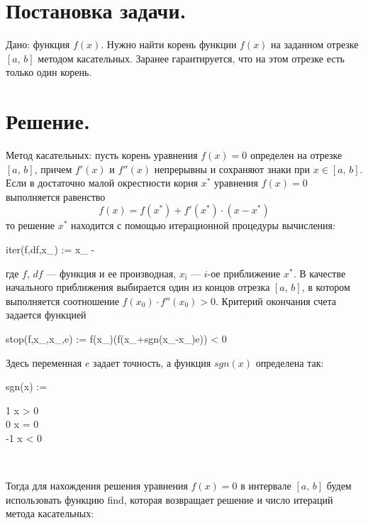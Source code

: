 \documentclass[a4paper, 14pt]{extarticle}
\begin{document}
\section*{Постановка задачи.}

Дано: функция $f(x)$. Нужно найти корень функции $f(x)$ на заданном отрезке $[a,\,b]$ методом касательных. Заранее гарантируется, что на этом отрезке есть только один корень.

\section*{Решение.}

Метод касательных: пусть корень уравнения $f(x)=0$ определен на отрезке $[a,\,b]$, причем $f'(x)$ и $f''(x)$ непрерывны и сохраняют знаки при $x\in[a,\,b]$. Если в достаточно малой окрестности корня $x^*$ уравнения $f(x)=0$ выполняется равенство
$$f(x)=f(x^*)+f'(x^*)\cdot(x-x^*)$$ то решение $x^*$ находится с помощью итерационной процедуры вычисления:
\begin{preproc}
	iter(f,df,x_) := x_ - \\
\end{preproc}
где $f$, $df$ --- функция и ее производная, $x_\text{i}$ --- $i$-ое приближение $x^*$. В качестве начального приближения выбирается один из концов отрезка $[a,\,b]$, в котором выполняется соотношение $f(x_0)\cdot f''(x_0)>0$.
Критерий окончания счета задается функцией
\begin{preproc}
	stop(f,x_,x_,e) := f(x_)\cdot(f(x_+sgn(x_-x_)\cdot e)) < 0\\
\end{preproc}
Здесь переменная $e$ задает точность, а функция $sgn(x)$ определена так:
\begin{preproc}
	sgn(x) := \begin{caseblock}
	1 \when x > 0 \\
	0 \when x = 0 \\
	-1 \when x < 0 
\end{caseblock}\\
\end{preproc}
Тогда для нахождения решения уравнения $f(x)=0$ в интервале $[a,\,b]$ будем использовать функцию find, которая возвращает решение и число итераций метода касательных:
\end{document}
